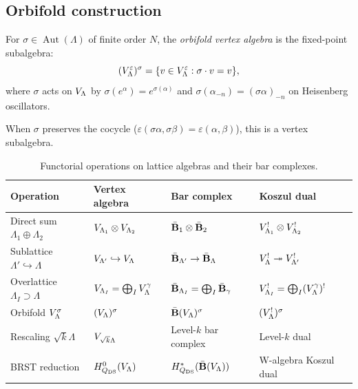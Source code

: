 \subsection{Orbifold construction}

\begin{construction}
\label{constr:lattice:orbifold}
For $\sigma \in \operatorname{Aut}(\Lambda)$ of finite order $N$,
the \emph{orbifold vertex algebra} is the fixed-point subalgebra:
\[
(V_\Lambda^\varepsilon)^\sigma
= \{v \in V_\Lambda^\varepsilon : \sigma \cdot v = v\},
\]
where $\sigma$ acts on $V_\Lambda$ by
$\sigma(e^\alpha) = e^{\sigma(\alpha)}$ and $\sigma(\alpha_{-n}) =
(\sigma\alpha)_{-n}$ on Heisenberg oscillators.

When $\sigma$ preserves the cocycle ($\varepsilon(\sigma\alpha,\sigma\beta)
= \varepsilon(\alpha,\beta)$), this is a vertex subalgebra.
\end{construction}

\begin{table}[ht]
\centering
\caption{Functorial operations on lattice algebras and their bar complexes.}
\label{tab:lattice:bar-operations}
\begin{tabular}{l l l l}
\textbf{Operation} & \textbf{Vertex algebra} & \textbf{Bar complex} & \textbf{Koszul dual} \\
\hline
Direct sum $\Lambda_1 \oplus \Lambda_2$
  & $V_{\Lambda_1} \otimes V_{\Lambda_2}$
  & $\bar{\mathbf{B}}_1 \otimes \bar{\mathbf{B}}_2$
  & $V_{\Lambda_1}^! \otimes V_{\Lambda_2}^!$ \\[3pt]
Sublattice $\Lambda' \hookrightarrow \Lambda$
  & $V_{\Lambda'} \hookrightarrow V_\Lambda$
  & $\bar{\mathbf{B}}_{\Lambda'} \to \bar{\mathbf{B}}_\Lambda$
  & $V_\Lambda^! \twoheadrightarrow V_{\Lambda'}^!$ \\[3pt]
Overlattice $\Lambda_I \supset \Lambda$
  & $V_{\Lambda_I} = \bigoplus_{I} V_\Lambda^\gamma$
  & $\bar{\mathbf{B}}_{\Lambda_I} = \bigoplus_{I} \bar{\mathbf{B}}_\gamma$
  & $V_{\Lambda_I}^! = \bigoplus_{I} (V_\Lambda^\gamma)^!$ \\[3pt]
Orbifold $V_\Lambda^\sigma$
  & $(V_\Lambda)^\sigma$
  & $\bar{\mathbf{B}}(V_\Lambda)^\sigma$
  & $(V_\Lambda^!)^\sigma$ \\[3pt]
Rescaling $\sqrt{k}\Lambda$
  & $V_{\sqrt{k}\Lambda}$
  & Level-$k$ bar complex
  & Level-$k$ dual \\[3pt]
BRST reduction
  & $H^0_{Q_{\mathrm{DS}}}(V_\Lambda)$
  & $H^*_{Q_{\mathrm{DS}}}(\bar{\mathbf{B}}(V_\Lambda))$
  & W-algebra Koszul dual
\end{tabular}
\end{table}

